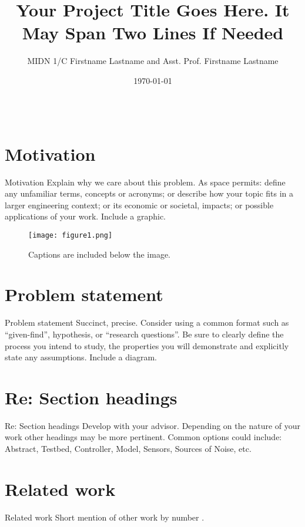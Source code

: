 \documentclass[pdf]{beamer}
\title{Your Project Title Goes Here.  It\\May Span Two Lines If Needed}
\author{MIDN 1/C Firstname Lastname and Asst. Prof. Firstname Lastname}
\institute[WRCE]{$^{1}$Weapons, Robotics, and Control Engineering, United States Naval Academy}
\date{\today}
\begin{document}
\begin{frame}[fragile]
\begin{columns}

\begin{column}{0.25\textwidth}
\begin{minipage}[t][\textheight]{\linewidth}
\section{Motivation}
\begin{block}{Motivation}
\small Explain why we care about this problem.  As space permits: define any unfamiliar terms, concepts or acronyms; or describe how your topic fits in a larger engineering context; or its economic or societal, impacts; or possible applications of your work.  Include a graphic.
\end{block}
\vfill 

\begin{figure}
\texttt{[image: figure1.png]}
\caption{Captions are included below the image.}
\end{figure}
\vfill

\section{Problem statement}
\begin{block}{Problem statement}
\small Succinct, precise. Consider using a common format such as ``given-find'', hypothesis, or ``research questions''. Be sure to clearly define the process you intend to study, the properties you will demonstrate and explicitly state any assumptions.  Include a diagram. 
\end{block}
\vfill

\section{Re: Section headings}
\begin{block}{Re: Section headings}
\small Develop with your advisor. Depending on the nature of your work other headings may be more pertinent. Common options could include: Abstract, Testbed, Controller, Model, Sensors, Sources of Noise, etc.
\end{block}
\vfill


\section{Related work}
\begin{block}{Related work}
\small Short mention of other work by number \cite{chen1993linear,chen1965automatic}.  
\end{block}
\end{minipage}
\end{column}






\end{columns}
\end{frame}
\end{document}
